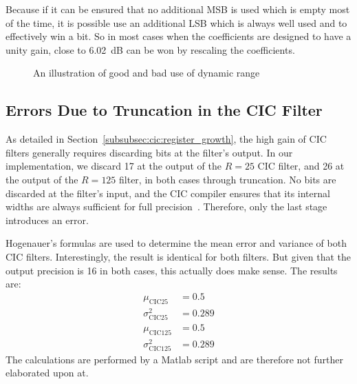 Because if  it can be ensured  that no additional  MSB is used which  is empty
most of the  time, it is possible  use an additional LSB which  is always well
used and to effectively win a bit. So  in most cases when the coefficients are
designed to have a unity gain, close to \SI{6.02}{\dB} can be won by rescaling
the coefficients.

\begin{figure}
    \centering
    
    \caption[Good Vs. Bad Use Of Dynamic Range]%
        {An illustration of good and bad use of dynamic range}
    \label{fig:fpga:dynamicrange}
\end{figure}

%
%
\subsection{Errors Due to Truncation in the CIC Filter} %
\label{subsec:fpga:errors_in_cic_filter}

As detailed in Section~\ref{subsubsec:cic:register_growth},  the high gain of
CIC filters generally requires discarding  bits at the filter's output. In our
implementation,  we discard  \SI{17}{\bit} at  the  output of  the $R=25$  CIC
filter, and \SI{26}{\bit}  at the output of the $R=125$  filter, in both cases
through  truncation. No bits  are discarded  at  the filter's  input, and  the
CIC  compiler ensures  that  its  internal widths  are  always sufficient  for
full  precision~\cite{xilinx:cic-compiler}. Therefore,  only  the  last  stage
introduces an error.

Hogenauer's formulas are used to determine the mean error and variance of both
CIC  filters. Interestingly, the  result  is identical  for both  filters. But
given that the output precision is  \SI{16}{\bit} in both cases, this actually
does make sense. The results are:
\begin{align}
    \mu_\mathrm{CIC25}       &= 0.5 \label{eq:fpga:cic:mu:cic25}  \\
    \sigma^2_\mathrm{CIC25}  &= 0.289\label{eq:fpga:cic:sigmasq:cic25} \\
    \mu_\mathrm{CIC125}      &= 0.5 \label{eq:fpga:cic:mu:cic125} \\
    \sigma^2_\mathrm{CIC125} &= 0.289\label{eq:fpga:cic:sigmasq:cic125}
\end{align}
The  calculations are  performed  by a  Matlab script  and  are therefore  not
further elaborated upon at.

